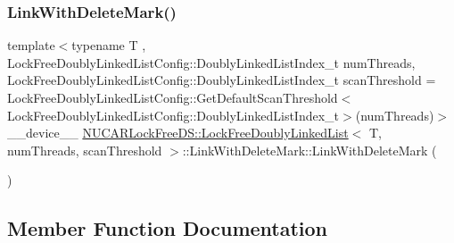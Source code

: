 \subsubsection{\texorpdfstring{Link\+With\+Delete\+Mark()}{LinkWithDeleteMark()}\hspace{0.1cm}{\footnotesize\ttfamily [5/5]}}
{\footnotesize\ttfamily template$<$typename T , Lock\+Free\+Doubly\+Linked\+List\+Config\+::\+Doubly\+Linked\+List\+Index\+\_\+t num\+Threads, Lock\+Free\+Doubly\+Linked\+List\+Config\+::\+Doubly\+Linked\+List\+Index\+\_\+t scan\+Threshold = Lock\+Free\+Doubly\+Linked\+List\+Config\+::\+Get\+Default\+Scan\+Threshold$<$\+Lock\+Free\+Doubly\+Linked\+List\+Config\+::\+Doubly\+Linked\+List\+Index\+\_\+t$>$(num\+Threads)$>$ \\
\+\_\+\+\_\+device\+\_\+\+\_\+ \mbox{\hyperlink{class_n_u_c_a_r_lock_free_d_s_1_1_lock_free_doubly_linked_list}{N\+U\+C\+A\+R\+Lock\+Free\+D\+S\+::\+Lock\+Free\+Doubly\+Linked\+List}}$<$ T, num\+Threads, scan\+Threshold $>$\+::Link\+With\+Delete\+Mark\+::\+Link\+With\+Delete\+Mark (\begin{DoxyParamCaption}{ }\end{DoxyParamCaption})\hspace{0.3cm}{\ttfamily [inline]}}



\subsection{Member Function Documentation}
\mbox{\label{class_n_u_c_a_r_lock_free_d_s_1_1_lock_free_doubly_linked_list_1_1_link_with_delete_mark_abd04793481353e77ddce79d713720e78}} 
